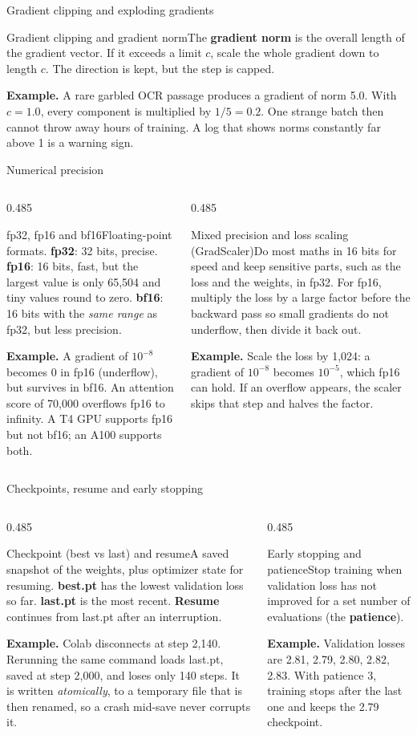 \documentclass[aspectratio=169,11pt]{beamer}
\newcommand{\term}[3]{%
  \begin{block}{#1}\small #2\par\vspace{1mm}%
  {\color{exgreen}\textbf{Example.}} #3\end{block}}
\newcommand{\twoterms}[6]{%
  \begin{columns}[T]
    \begin{column}{0.485\textwidth}\term{#1}{#2}{#3}\end{column}
    \begin{column}{0.485\textwidth}\term{#4}{#5}{#6}\end{column}
  \end{columns}}
\begin{document}
\begin{frame}{Gradient clipping and exploding gradients}
  \term{Gradient clipping and gradient norm}
  {The \textbf{gradient norm} is the overall length of the gradient vector. If it exceeds a limit $c$, scale the whole gradient down to length $c$. The direction is kept, but the step is capped.}
  {A rare garbled OCR passage produces a gradient of norm 5.0. With $c=1.0$, every component is multiplied by $1/5=0.2$. One strange batch then cannot throw away hours of training. A log that shows norms constantly far above 1 is a warning sign.}
\end{frame}

\begin{frame}{Numerical precision}
  \twoterms{fp32, fp16 and bf16}
  {Floating-point formats. \textbf{fp32}: 32 bits, precise. \textbf{fp16}: 16 bits, fast, but the largest value is only 65,504 and tiny values round to zero. \textbf{bf16}: 16 bits with the \emph{same range} as fp32, but less precision.}
  {A gradient of $10^{-8}$ becomes 0 in fp16 (underflow), but survives in bf16. An attention score of 70,000 overflows fp16 to infinity. A T4 GPU supports fp16 but not bf16; an A100 supports both.}
  {Mixed precision and loss scaling (GradScaler)}
  {Do most maths in 16 bits for speed and keep sensitive parts, such as the loss and the weights, in fp32. For fp16, multiply the loss by a large factor before the backward pass so small gradients do not underflow, then divide it back out.}
  {Scale the loss by 1,024: a gradient of $10^{-8}$ becomes $10^{-5}$, which fp16 can hold. If an overflow appears, the scaler skips that step and halves the factor.}
\end{frame}

\begin{frame}{Checkpoints, resume and early stopping}
  \twoterms{Checkpoint (best vs last) and resume}
  {A saved snapshot of the weights, plus optimizer state for resuming. \textbf{best.pt} has the lowest validation loss so far. \textbf{last.pt} is the most recent. \textbf{Resume} continues from last.pt after an interruption.}
  {Colab disconnects at step 2,140. Rerunning the same command loads last.pt, saved at step 2,000, and loses only 140 steps. It is written \emph{atomically}, to a temporary file that is then renamed, so a crash mid-save never corrupts it.}
  {Early stopping and patience}
  {Stop training when validation loss has not improved for a set number of evaluations (the \textbf{patience}).}
  {Validation losses are 2.81, 2.79, 2.80, 2.82, 2.83. With patience 3, training stops after the last one and keeps the 2.79 checkpoint.}
\end{frame}
\end{document}
